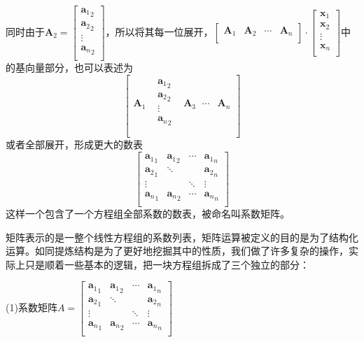 \documentclass[fontset=none]{ctexart}
\begin{document}
同时由于$\boldsymbol{A}_2=\left[ \begin{array}{c}
	{\boldsymbol{a}_1}_2\\
	{\boldsymbol{a}_2}_2\\
	\vdots\\
	{\boldsymbol{a}_n}_2\\
\end{array} \right] $，所以将其每一位展开，$\left[ \begin{matrix}
	\boldsymbol{A}_1&		\boldsymbol{A}_2&		\cdots&		\boldsymbol{A}_n\\
\end{matrix} \right] \cdot \left[ \begin{array}{c}
	\boldsymbol{x}_1\\
	\boldsymbol{x}_2\\
	\vdots\\
	\boldsymbol{x}_n\\
\end{array} \right] $中的基向量部分，也可以表述为$$\left[ \begin{matrix}
	\boldsymbol{A}_1&		\begin{array}{c}
	{\boldsymbol{a}_1}_2\\
	{\boldsymbol{a}_2}_2\\
	\vdots\\
	{\boldsymbol{a}_n}_2\\
\end{array}&		\boldsymbol{A}_3\ \ \,\cdots&		\boldsymbol{A}_n\\
\end{matrix} \right]$$或者全部展开，形成更大的数表$$\left[ \begin{matrix}
	{\boldsymbol{a}_1}_1&		{\boldsymbol{a}_1}_2&		\cdots&		{\boldsymbol{a}_1}_n\\
	{\boldsymbol{a}_2}_1&		\ddots&		&		{\boldsymbol{a}_2}_n\\
	\vdots&		&		\ddots&		\vdots\\
	{\boldsymbol{a}_n}_1&		{\boldsymbol{a}_n}_2&		\cdots&		{\boldsymbol{a}_n}_n\\
\end{matrix} \right]$$这样一个包含了一个方程组全部系数的数表，被命名叫系数矩阵。

矩阵表示的是一整个线性方程组的系数列表，矩阵运算被定义的目的是为了结构化运算。如同提炼结构是为了更好地挖掘其中的性质，我们做了许多复杂的操作，实际上只是顺着一些基本的逻辑，把一块方程组拆成了三个独立的部分：

(1)系数矩阵$A=\left[ \begin{matrix}
	{\boldsymbol{a}_1}_1&		{\boldsymbol{a}_1}_2&		\cdots&		{\boldsymbol{a}_1}_n\\
	{\boldsymbol{a}_2}_1&		\ddots&		&		{\boldsymbol{a}_2}_n\\
	\vdots&		&		\ddots&		\vdots\\
	{\boldsymbol{a}_n}_1&		{\boldsymbol{a}_n}_2&		\cdots&		{\boldsymbol{a}_n}_n\\
\end{matrix} \right]$
\end{document}
